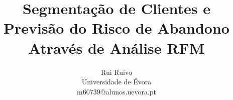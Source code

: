 \documentclass{easychair}
\begin{document}
\raggedbottom

\title{Segmentação de Clientes e Previsão do Risco de Abandono Através de Análise RFM}

\titlerunning{}

%

\author{Rui Ruivo\\
Universidade de Évora\\
m60739@alunos.uevora.pt\\
}


\maketitle
\end{document}
